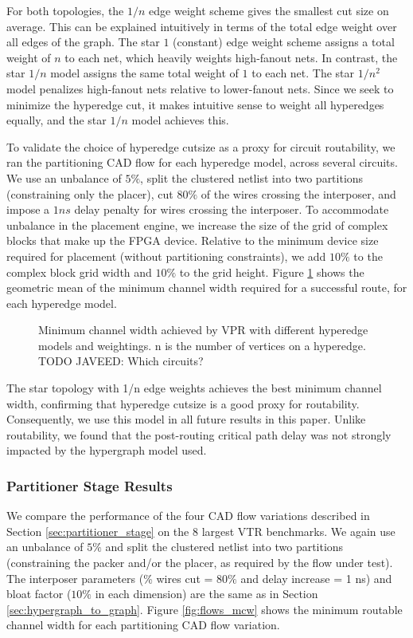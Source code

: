 For both topologies, the $1/n$ edge weight scheme gives the smallest cut size on average. This can be explained intuitively in terms of the total edge weight over all edges of the graph. The star $1$ (constant) edge weight scheme assigns a total weight of $n$ to each net, which heavily weights high-fanout nets. In contrast, the star $1/n$ model assigns the same total weight of $1$ to each net. The star $1/n^2$ model penalizes high-fanout nets relative to lower-fanout nets. Since we seek to minimize the hyperedge cut, it makes intuitive sense to weight all hyperedges equally, and the star $1/n$ model achieves this.

To validate the choice of hyperedge cutsize as a proxy for circuit routability, we ran the partitioning CAD flow for each hyperedge model, across several circuits. We use an unbalance of $5\%$, split the clustered netlist into two partitions (constraining only the placer), cut $80\%$ of the wires crossing the interposer, and impose a $1ns$ delay penalty for wires crossing the interposer. To accommodate unbalance in the placement engine, we increase the size of the grid of complex blocks that make up the FPGA device. Relative to the minimum device size required for placement (without partitioning constraints), we add $10\%$ to the complex block grid width and $10\%$ to the grid height. Figure \ref{fig:graph_topology_mcw} shows the geometric mean of the minimum channel width required for a successful route, for each hyperedge model.

\begin{figure}[!htbp]
\centering

\caption{Minimum channel width achieved by VPR with different hyperedge models and weightings. n is the number of vertices on a hyperedge. TODO JAVEED: Which circuits?}
\label{fig:graph_topology_mcw}
\end{figure}

The star topology with 1/n edge weights achieves the best minimum channel width, confirming that hyperedge cutsize is a good proxy for routability. Consequently, we use this model in all future results in this paper. Unlike routability, we found that the post-routing critical path delay was not strongly impacted by the hypergraph model used.

\subsubsection{Partitioner Stage Results}\label{sec:partitioner_stage_results}
We compare the performance of the four CAD flow variations described in Section \ref{sec:partitioner_stage} on the 8 largest VTR benchmarks. We again use an unbalance of $5\%$ and split the clustered netlist into two partitions (constraining the packer and/or the placer, as required by the flow under test). The interposer parameters (\% wires cut = $80\%$ and delay increase = 1 ns) and bloat factor ($10\%$ in each dimension) are the same as in Section \ref{sec:hypergraph_to_graph}. Figure \ref{fig:flows_mcw} shows the minimum routable channel width for each partitioning CAD flow variation.

